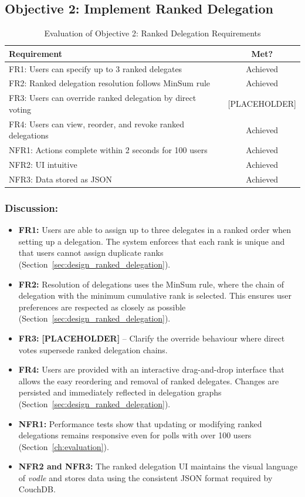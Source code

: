 \subsection{Objective 2: Implement Ranked Delegation}

\begin{table}[H]
\centering
\begin{tabular}{|p{9cm}|c|}
\hline
\textbf{Requirement} & \textbf{Met?} \\ \hline
FR1: Users can specify up to 3 ranked delegates & Achieved \\ \hline
FR2: Ranked delegation resolution follows MinSum rule & Achieved \\ \hline
FR3: Users can override ranked delegation by direct voting & [PLACEHOLDER] \\ \hline
FR4: Users can view, reorder, and revoke ranked delegations & Achieved \\ \hline
NFR1: Actions complete within 2 seconds for 100 users & Achieved \\ \hline
NFR2: UI intuitive & Achieved \\ \hline
NFR3: Data stored as JSON & Achieved \\ \hline
\end{tabular}
\caption{Evaluation of Objective 2: Ranked Delegation Requirements}
\label{tab:objective2_requirements}
\end{table}

\subsubsection{Discussion:}

\begin{itemize}
    \item \textbf{FR1:} Users are able to assign up to three delegates in a ranked order when setting up a delegation. The system enforces that each rank is unique and that users cannot assign duplicate ranks (Section~\ref{sec:design_ranked_delegation}).
    \item \textbf{FR2:} Resolution of delegations uses the MinSum rule, where the chain of delegation with the minimum cumulative rank is selected. This ensures user preferences are respected as closely as possible (Section~\ref{sec:design_ranked_delegation}).
    \item \textbf{FR3:} \textbf{[PLACEHOLDER]} -- Clarify the override behaviour where direct votes supersede ranked delegation chains.
    \item \textbf{FR4:} Users are provided with an interactive drag-and-drop interface that allows the easy reordering and removal of ranked delegates. Changes are persisted and immediately reflected in delegation graphs (Section~\ref{sec:design_ranked_delegation}).
    \item \textbf{NFR1:} Performance tests show that updating or modifying ranked delegations remains responsive even for polls with over 100 users (Section~\ref{ch:evaluation}).
    \item \textbf{NFR2 and NFR3:} The ranked delegation UI maintains the visual language of \textit{vodle} and stores data using the consistent JSON format required by CouchDB.
\end{itemize}

